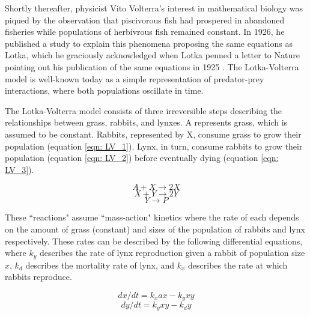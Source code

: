 \documentclass[12pt]{report}
\begin{document}
Shortly thereafter, physicist Vito Volterra's interest in mathematical biology was piqued by the observation that piscivorous fish had prospered in abandoned fisheries while populations of herbivrous fish remained constant. In 1926, he published a study to explain this phenomena proposing the same equations as Lotka, which he graciously acknowledged when Lotka penned a letter to Nature pointing out his publication of the same equations in 1925 \cite{Volterra, lotka-volterra}. The Lotka-Volterra model is well-known today as a simple representation of predator-prey interactions, where both populations oscillate in time. 

The Lotka-Volterra model consists of three irreversible steps describing the relationships between grass, rabbits, and lynxes. A represents grass, which is assumed to be constant. Rabbits, represented by X, consume grass to grow their population (equation \ref{eqn: LV_1}). Lynx, in turn, consume rabbits to grow their population (equation \ref{eqn: LV_2}) before eventually dying (equation \ref{eqn: LV_3}).

\begin{equation}
\label{eqn: LV_1}
A + X \to 2X
\end{equation}
\begin{equation}
\label{eqn: LV_2}
X + Y \to 2Y
\end{equation}
\begin{equation}
\label{eqn: LV_3}
Y \to P
\end{equation}

These ``reactions" assume ``mass-action" kinetics where the rate of each depends on the amount of grass (constant) and sizes of the population of rabbits and lynx respectively. These rates can be described by the following differential equations, where ${k_{y}}$ describes the rate of lynx reproduction given a rabbit of population size ${x}$, ${k_{d}}$ describes the mortality rate of lynx, and ${k_{x}}$ describes the rate at which rabbits reproduce. 

\begin{equation}
dx/dt = k_{x}ax - k_{y}xy
\end{equation}
\begin{equation}
dy/dt = k_{y}xy - k_{d}y
\end{equation}
\end{document}
